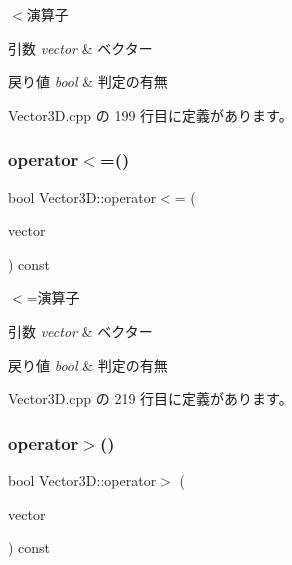 $<$演算子 


\begin{DoxyParams}{引数}
{\em vector} & ベクター \\
\hline
\end{DoxyParams}

\begin{DoxyRetVals}{戻り値}
{\em bool} & 判定の有無 \\
\hline
\end{DoxyRetVals}


 Vector3\+D.\+cpp の 199 行目に定義があります。

\mbox{\label{class_vector3_d_ada60cd10b049b046da1254b83a30f133}} 
\subsubsection{\texorpdfstring{operator$<$=()}{operator<=()}}
{\footnotesize\ttfamily bool Vector3\+D\+::operator$<$= (\begin{DoxyParamCaption}\item[{const \mbox{\hyperlink{class_vector3_d}{Vector3D}} \&}]{vector }\end{DoxyParamCaption}) const}



$<$=演算子 


\begin{DoxyParams}{引数}
{\em vector} & ベクター \\
\hline
\end{DoxyParams}

\begin{DoxyRetVals}{戻り値}
{\em bool} & 判定の有無 \\
\hline
\end{DoxyRetVals}


 Vector3\+D.\+cpp の 219 行目に定義があります。

\mbox{\label{class_vector3_d_a06de9e8940880c4241e05533a7ad0db9}} 
\subsubsection{\texorpdfstring{operator$>$()}{operator>()}}
{\footnotesize\ttfamily bool Vector3\+D\+::operator$>$ (\begin{DoxyParamCaption}\item[{const \mbox{\hyperlink{class_vector3_d}{Vector3D}} \&}]{vector }\end{DoxyParamCaption}) const}



